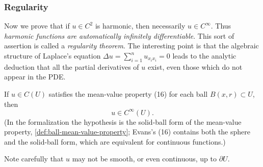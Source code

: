 \subsubsection{Regularity}
\label{sec:laplace-regularity}

Now we prove that if $u \in C^2$ is harmonic, then necessarily $u \in C^\infty$. Thus \textit{harmonic functions are automatically infinitely differentiable}. This sort of assertion is called a \textit{regularity theorem}. The interesting point is that the algebraic structure of Laplace's equation $\Delta u = \sum_{i=1}^n u_{x_i x_i} = 0$ leads to the analytic deduction that all the partial derivatives of $u$ exist, even those which do not appear in the PDE.

\begin{theorem}[Smoothness]
\label{thm:harmonic-functions-smooth}
\leanok
If $u \in C(U)$ satisfies the mean-value property (16) for each ball $B(x,r) \subset U$, then
$$u \in C^\infty(U).$$
(In the formalization the hypothesis is the solid-ball form of the mean-value
property, \cref{def:ball-mean-value-property}; Evans's (16) contains both the
sphere and the solid-ball form, which are equivalent for continuous functions.)
\end{theorem}

Note carefully that $u$ may not be smooth, or even continuous, up to $\partial U$.

